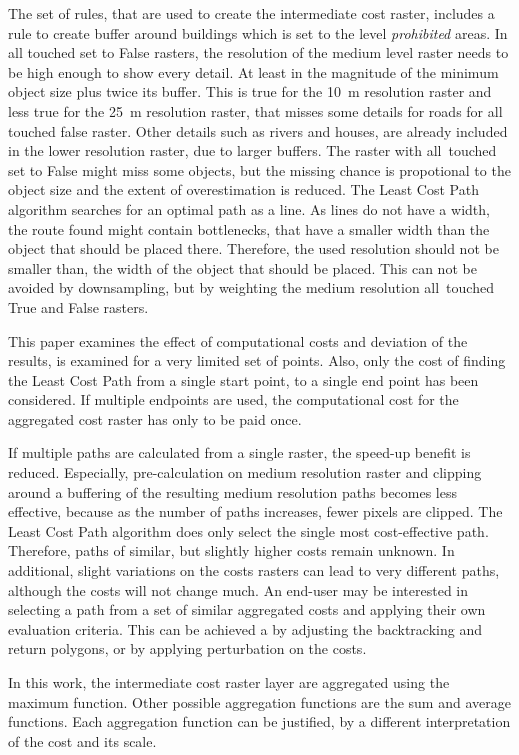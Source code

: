 The set of rules, that are used to create the intermediate cost raster, includes a rule to create buffer around buildings which is set to the level \textit{prohibited} areas.
In all touched set to False rasters, the resolution of the medium level raster needs to be high enough to show every detail.
At least in the magnitude of the minimum object size plus twice its buffer.
This is true for the 10~m resolution raster and less true for the 25~m resolution raster, that misses some details for roads for all touched false raster.
Other details such as rivers and houses, are already included in the lower resolution raster, due to larger buffers.
The raster with all~touched set to False might miss some objects, but the missing chance is propotional to the object size and the extent of overestimation is reduced.
The Least Cost Path algorithm searches for an optimal path as a line.
As lines do not have a width, the route found might contain bottlenecks, that have a smaller width than the object that should be placed there.
Therefore, the used resolution should not be smaller than, the width of the object that should be placed.
This can not be avoided by downsampling, but by weighting the medium resolution all~touched True and False rasters.


This paper examines the effect of computational costs and deviation of the results, is examined for a very limited set of points.
Also, only the cost of finding the Least Cost Path from a single start point, to a single end point has been considered.
If multiple endpoints are used, the computational cost for the aggregated cost raster has only to be paid once.

If multiple paths are calculated from a single raster, the speed-up benefit is reduced.
Especially, pre-calculation on medium resolution raster and clipping around a buffering of the resulting medium resolution paths becomes less effective, because as the number of paths increases, fewer pixels are clipped.
The Least Cost Path algorithm does only select the single most cost-effective path.
Therefore, paths of similar, but slightly higher costs remain unknown.
In additional, slight variations on the costs rasters can lead to very different paths, although the costs will not change much.
An end-user may be interested in selecting a path from a set of similar aggregated costs and applying their own evaluation criteria.
This can be achieved a by adjusting the backtracking and return polygons, or by applying perturbation on the costs.

In this work, the intermediate cost raster layer are aggregated using the maximum function. 
Other possible aggregation functions are the sum and average functions.
Each aggregation function can be justified, by a different interpretation of the cost and its scale.

